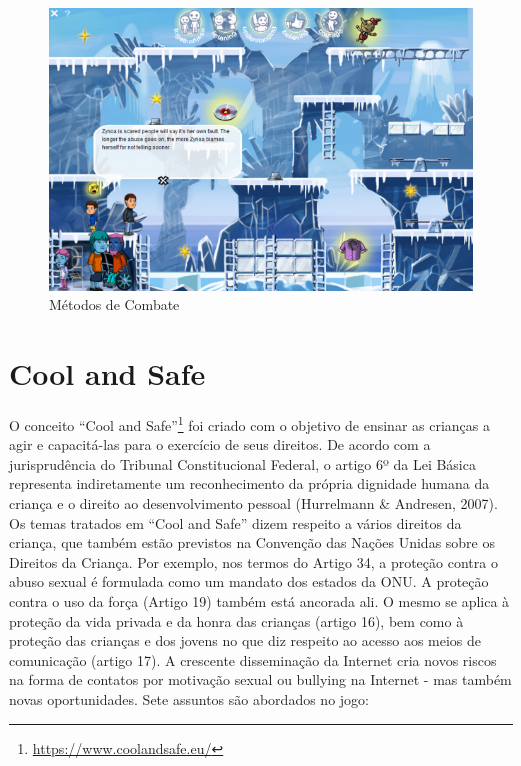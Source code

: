 \begin{figure}[htb]

	\caption{\label{fig:Riscos}Métodos de Combate}
  \begin{center}
    \includegraphics[width=0.5\linewidth]{./Figuras/Orbit/speak-up.png}
	\end{center}

\end{figure}


\cite{jones2020serious}





\newpage

\section{Cool and Safe}\label{sssec:CeS}


O conceito “Cool and Safe”\footnote{\url{https://www.coolandsafe.eu/}}  foi criado com o objetivo de ensinar as crianças a agir e capacitá-las para o exercício de seus direitos. De acordo com a jurisprudência do Tribunal Constitucional Federal, o artigo 6º da Lei Básica representa indiretamente um reconhecimento da própria dignidade humana da criança e o direito ao desenvolvimento pessoal (Hurrelmann \& Andresen, 2007). Os temas tratados em “Cool and Safe” dizem respeito a vários direitos da criança, que também estão previstos na Convenção das Nações Unidas sobre os Direitos da Criança. Por exemplo, nos termos do Artigo 34, a proteção contra o abuso sexual é formulada como um mandato dos estados da ONU. A proteção contra o uso da força (Artigo 19) também está ancorada ali. O mesmo se aplica à proteção da vida privada e da honra das crianças (artigo 16), bem como à proteção das crianças e dos jovens no que diz respeito ao acesso aos meios de comunicação (artigo 17). A crescente disseminação da Internet cria novos riscos na forma de contatos por motivação sexual ou bullying na Internet - mas também novas oportunidades. Sete assuntos são abordados no jogo:

